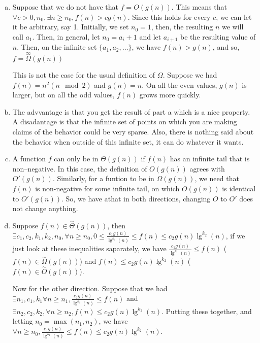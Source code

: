 \documentclass{article}
\begin{document}
\begin{enumerate}[a.]
\item
Suppose that we do not have that $f=O(g(n))$. This means that $\forall c>0,n_0, \exists n\ge n_0, f(n) > c g(n)$. Since this holds for every $c$, we can let it be arbitrary, say 1. Initially, we set $n_0=1$, then, the resulting $n$ we will call $a_1$. Then, in general, let $n_0= a_i+1$ and let $a_{i+1}$ be the resulting value of $n$. Then, on the infinite set $\{a_1,a_2,\ldots\}$, we have $f(n)>g(n)$, and so, $f = \overset{\infty}{\Omega}(g(n))$

This is not the case for the usual definition of $\Omega$. Suppose we had $f(n) = n^2(n\mod 2)$ and $g(n) = n$. On all the even values, $g(n)$ is larger, but on all the odd values, $f(n)$ grows more quickly.

\item
The advvantage is that you get the result of part a which is a nice property. A disadantage is that the infinite set of points on which you are making claims of the behavior could  be very sparse. Also, there is nothing said about the behavior when outside of this infinite set, it can do whatever it wants.

\item
A function $f$ can only be in $\Theta(g(n))$ if $f(n)$ has an infinite tail that is non--negative. In this case, the definition of $O(g(n))$ agrees with $O'(g(n))$. Similarly, for a funtion to be in $\Omega(g(n))$, we need that $f(n)$ is non-negative for some infinite tail, on which $O(g(n))$ is identical to $O'(g(n))$. So, we have athat in both directions, changing $O$ to $O'$ does not change anything.

\item
Suppose $f(n)\in \overset{\sim}{\Theta}(g(n))$, then $\exists c_1,c_2,k_1,k_2,n_0, \forall n\ge n_0, 0\le \frac{c_1 g(n)}{\lg^{k_1}(n)} \le f(n) \le c_2 g(n)\lg^{k_2}(n)$, if we just look at these inequalities saparately, we have $\frac{c_1 g(n)}{\lg^{k_1}(n)} \le f(n)$ ($f(n) \in \overset{\sim}{\Omega}(g(n))$) and $f(n) \le c_2 g(n)\lg^{k_2}(n)$ ($f(n)\in \overset{\sim}{O}(g(n))$).

Now for the other direction. Suppose that we had $\exists n_1, c_1,k_1 \forall n\ge n_1, \frac{c_1 g(n)}{\lg^{k_1}(n)} \le f(n)$ and $\exists n_2,c_2,k_2, \forall n\ge n_2, f(n)\le c_2g(n)\lg^{k_2}(n)$. Putting these together, and letting $n_0 = \max(n_1,n_2)$, we have $\forall n\ge n_0, \frac{c_1 g(n)}{\lg^{k_1}(n)} \le f(n) \le c_2 g(n)\lg^{k_2}(n)$. 

\end{enumerate}
\end{document}
